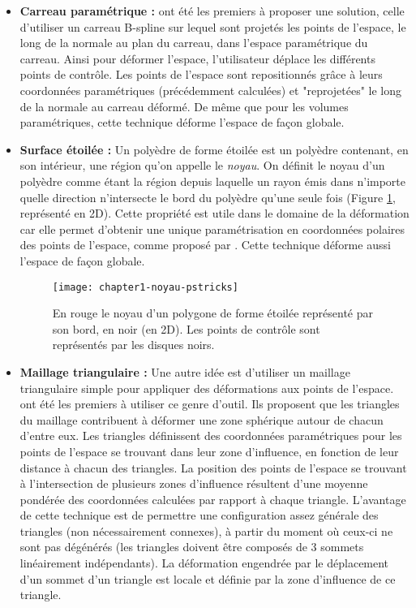 \begin{itemize}

\item{\textbf{Carreau paramétrique :}} \cite{JLQ96} ont été les premiers à
proposer une solution, celle d'utiliser un carreau B-spline sur lequel sont
projetés les points de l'espace, le long de la normale au plan du carreau,
dans l'espace paramétrique du carreau. Ainsi pour déformer l'espace,
l'utilisateur déplace les différents points de contrôle. Les points de
l'espace sont repositionnés grâce à leurs coordonnées paramétriques
(précédemment calculées) et "reprojetées" le long de la normale au carreau
déformé. De même que pour les volumes paramétriques, cette technique déforme
l'espace de façon globale.

\item{\textbf{Surface étoilée :}} Un polyèdre de forme étoilée est un polyèdre
contenant, en son intérieur, une région qu'on appelle le \textit{noyau}. On
définit le noyau d'un polyèdre comme étant la région depuis laquelle un rayon
émis dans n'importe quelle direction n'intersecte le bord du polyèdre qu'une
seule fois (Figure \ref{SUReto}, représenté en 2D). Cette propriété est utile
dans le domaine de la déformation car elle permet d'obtenir une unique
paramétrisation en coordonnées polaires des points de l'espace, comme proposé
par \cite{JL00}. Cette technique déforme aussi l'espace de façon globale.

 \begin{figure}[!ht]
  \texttt{[image: chapter1-noyau-pstricks]}

  \caption[Noyau d'un polygone] {En rouge le noyau d'un polygone de forme
étoilée représenté par son bord, en noir (en 2D). Les points de contrôle sont
représentés par les disques noirs.}

  \label{SUReto}
 \end{figure}

\item{\textbf{Maillage triangulaire :}} Une autre idée est d'utiliser un
maillage triangulaire simple pour appliquer des déformations aux points de
l'espace. \cite{KO03} ont été les premiers à utiliser ce genre d'outil. Ils
proposent que les triangles du maillage contribuent à déformer une zone
sphérique autour de chacun d'entre eux. Les triangles définissent des
coordonnées paramétriques pour les points de l'espace se trouvant dans leur
zone d'influence, en fonction de leur distance à chacun des triangles. La
position des points de l'espace se trouvant à l'intersection de plusieurs
zones d'influence résultent d'une moyenne pondérée des coordonnées calculées
par rapport à chaque triangle. L'avantage de cette technique est de permettre
une configuration assez générale des triangles (non nécessairement connexes),
à partir du moment où ceux-ci ne sont pas dégénérés (les triangles doivent
être composés de 3 sommets linéairement indépendants). La déformation
engendrée par le déplacement d'un sommet d'un triangle est locale et définie
par la zone d'influence de ce triangle.


\end{itemize}
